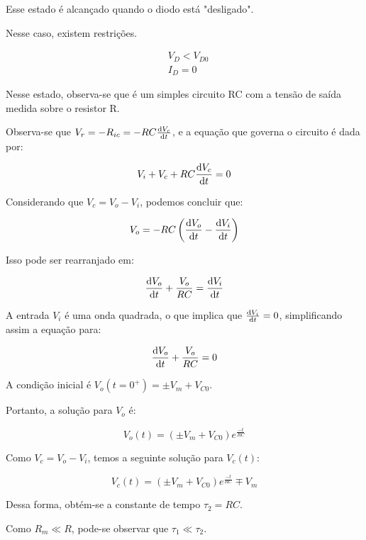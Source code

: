 Esse estado é alcançado quando o diodo está "desligado".

Nesse caso, existem restrições.

\begin{equation}
    \begin{aligned}
         & V_D < V_{D0} \\
         & I_D = 0
    \end{aligned}
\end{equation}

Nesse estado, observa-se que é um simples circuito RC com a tensão de saída medida sobre o resistor R.

Observa-se que $V_r = - R_{ic} = - R C \frac{\mathrm d V_c}{\mathrm d t}$, e a equação que governa o circuito é dada por:

\begin{equation}
    V_i + V_c + R C \frac{\mathrm d V_c}{\mathrm d t} = 0
\end{equation}

Considerando que $V_c = V_o - V_i$, podemos concluir que:

\begin{equation}
    V_o = - R C \left( \frac{\mathrm d V_o}{\mathrm d t} - \frac{\mathrm d V_i}{\mathrm d t} \right)
\end{equation}

Isso pode ser rearranjado em:

\begin{equation}
    \frac{\mathrm d V_o}{\mathrm d t} + \frac{V_o}{R C} = \frac{\mathrm d V_i}{\mathrm d t}
\end{equation}

A entrada $V_i$ é uma onda quadrada, o que implica que $\frac{\mathrm d V_i}{\mathrm d t} = 0$, simplificando assim a equação para:

\begin{equation}
    \frac{\mathrm d V_o}{\mathrm d t} + \frac{V_o}{R C} = 0
\end{equation}

A condição inicial é $V_o(t=0^{+}) = \pm V_m + V_{C0}$.

Portanto, a solução para $V_o$ é:

\begin{equation}
    \label{eq:vo_estado2}
    V_o(t) = (\pm V_m + V_{C0}) e^{\frac{-t}{R C}}
\end{equation}

Como $V_c = V_o - V_i$, temos a seguinte solução para $V_c(t)$:

\begin{equation}
    \label{eq:vc_estado2}
    V_c(t) = (\pm V_m + V_{C0}) e^{\frac{-t}{R C}} \mp V_m
\end{equation}

Dessa forma, obtém-se a constante de tempo $\tau_2 = R C$.

Como $R_m \ll R$, pode-se observar que $\tau_1 \ll \tau_2$.

